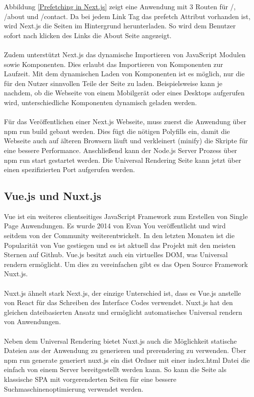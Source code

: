 \documentclass[runningheads]{llncs}
\begin{document}
Abbildung \ref{Prefetching in Next.js} zeigt eine Anwendung mit 3 Routen für /, /about und /contact. 
Da bei jedem Link Tag das prefetch Attribut vorhanden ist, 
wird Next.js die Seiten im Hintergrund herunterladen. 
So wird dem Benutzer sofort nach klicken des Links die About Seite angezeigt.
\\
\\
Zudem unterstützt Next.js das dynamische Importieren von JavaScript Modulen sowie Komponenten. 
Dies erlaubt das Importieren von Komponenten zur Laufzeit. 
Mit dem dynamischen Laden von Komponenten ist es möglich, 
nur die für den Nutzer sinnvollen Teile der Seite zu laden. 
Beispielsweise kann je nachdem, 
ob die Webseite von einem Mobilgerät oder eines Desktops aufgerufen wird, 
unterschiedliche Komponenten dynamisch geladen werden. 
\\
\\
Für das Veröffentlichen einer Next.js Webseite, 
muss zuerst die Anwendung über npm run build gebaut werden. 
Dies fügt die nötigen Polyfills ein, 
damit die Webseite auch auf älteren Browsern läuft und 
verkleinert (minify) die Skripte für eine bessere Performance. 
Anschließend kann der Node.js Server Prozess über npm run start gestartet werden. 
Die Universal Rendering Seite kann jetzt über einen spezifizierten Port aufgerufen werden.
\subsection{Vue.js und Nuxt.js}
\label{subsec:Vue.js und Nuxt.js}
Vue ist ein weiteres clientseitiges JavaScript Framework 
zum Erstellen von Single Page Anwendungen. 
Es wurde 2014 von Evan You veröffentlicht und 
wird seitdem von der Community weiterentwickelt. 
In den letzten Monaten ist die Popularität von Vue gestiegen und 
es ist aktuell das Projekt mit den meisten Sternen auf Github. 
Vue.js besitzt auch ein virtuelles DOM, 
was Universal rendern ermöglicht. 
Um dies zu vereinfachen gibt es das Open Source Framework Nuxt.js.
\\
\\
Nuxt.js ähnelt stark Next.js, 
der einzige Unterschied ist, 
dass es Vue.js anstelle von React für das Schreiben des Interface Codes verwendet. 
Nuxt.js hat den gleichen dateibasierten Ansatz und ermöglicht automatisches Universal rendern von Anwendungen.
\\
\\
Neben dem Universal Rendering bietet Nuxt.js auch die Möglichkeit statische Dateien aus der Anwendung zu generieren und 
prerendering zu verwenden.
Über npm run generate generiert nuxt.js ein dist Ordner mit einer index.html Datei 
die einfach von einem Server bereitgestellt werden kann. 
So kann die Seite als klassische SPA mit vorgerenderten Seiten für eine bessere Suchmaschinenoptimierung verwendet werden.
\end{document}
